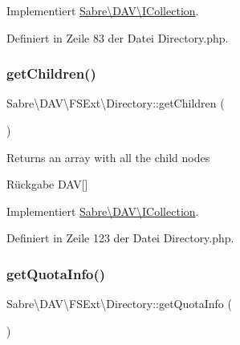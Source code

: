 Implementiert \mbox{\hyperlink{interface_sabre_1_1_d_a_v_1_1_i_collection_a09f82b07550611752abb149f468b89c2}{Sabre\textbackslash{}\+D\+A\+V\textbackslash{}\+I\+Collection}}.



Definiert in Zeile 83 der Datei Directory.\+php.

\mbox{\label{class_sabre_1_1_d_a_v_1_1_f_s_ext_1_1_directory_a1e4053591ca60a6abd189f88b6ed1bba}} 
\subsubsection{\texorpdfstring{get\+Children()}{getChildren()}}
{\footnotesize\ttfamily Sabre\textbackslash{}\+D\+A\+V\textbackslash{}\+F\+S\+Ext\textbackslash{}\+Directory\+::get\+Children (\begin{DoxyParamCaption}{ }\end{DoxyParamCaption})}

Returns an array with all the child nodes

\begin{DoxyReturn}{Rückgabe}
D\+AV\mbox{[}\mbox{]} 
\end{DoxyReturn}


Implementiert \mbox{\hyperlink{interface_sabre_1_1_d_a_v_1_1_i_collection_a5344a6890e49fd7a81bb0e38b4c6d0be}{Sabre\textbackslash{}\+D\+A\+V\textbackslash{}\+I\+Collection}}.



Definiert in Zeile 123 der Datei Directory.\+php.

\mbox{\label{class_sabre_1_1_d_a_v_1_1_f_s_ext_1_1_directory_ade982b162db5a0310179c05a2d47a507}} 
\subsubsection{\texorpdfstring{get\+Quota\+Info()}{getQuotaInfo()}}
{\footnotesize\ttfamily Sabre\textbackslash{}\+D\+A\+V\textbackslash{}\+F\+S\+Ext\textbackslash{}\+Directory\+::get\+Quota\+Info (\begin{DoxyParamCaption}{ }\end{DoxyParamCaption})}

